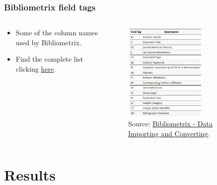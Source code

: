 \documentclass[aspectratio=169]{beamer}
\begin{document}
\begin{frame}
    \frametitle{Bibliometrix field tags}
    \begin{columns}
		\begin{column}{0.5\textwidth}
            \begin{itemize}
                \item Some of the column names used by Bibliometrix.
                \item Find the complete list clicking 
     \href{https://www.bibliometrix.org/documents/Field_Tags_bibliometrix.pdf}
                    {here}.
            \end{itemize}
		\end{column}
		\begin{column}{0.5\textwidth}
            \begin{figure}
                \centering
                \includegraphics[width=0.7\textwidth]
                {img/bibliometrix_field_tags.png}
                \caption{Source: 
\href{https://www.bibliometrix.org/vignettes/Data-Importing-and-Converting.html}
                {Bibliometrix - Data Importing and Converting}.}
            \end{figure}
		\end{column}
    \end{columns}
\end{frame}



\section{Results} 
\end{document}
